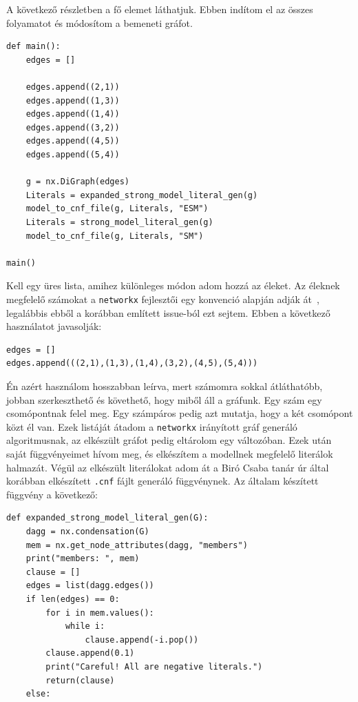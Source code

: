 \documentclass[
]{thesis-ekf}
\theoremstyle{definition}
\theoremstyle{remark}
\begin{document}
	A következő részletben a fő elemet láthatjuk. Ebben indítom el az összes folyamatot és módosítom a bemeneti gráfot.
	
	\begin{lstlisting}
def main():
	edges = []
	
	edges.append((2,1))
	edges.append((1,3))
	edges.append((1,4))
	edges.append((3,2))
	edges.append((4,5))
	edges.append((5,4))
	
	g = nx.DiGraph(edges)
	Literals = expanded_strong_model_literal_gen(g)
	model_to_cnf_file(g, Literals, "ESM")
	Literals = strong_model_literal_gen(g)
	model_to_cnf_file(g, Literals, "SM")
	
main()
	\end{lstlisting}

	
	Kell egy üres lista, amihez különleges módon adom hozzá az éleket. Az éleknek megfelelő számokat a \texttt{networkx} fejlesztői egy konvenció alapján adják át~\cite{git-issue-for-examples}, legalábbis ebből a korábban említett issue-ból ezt sejtem. Ebben a következő használatot javasolják:
	
	\begin{lstlisting}
edges = []
edges.append(((2,1),(1,3),(1,4),(3,2),(4,5),(5,4)))
	\end{lstlisting}
	
	Én azért használom hosszabban leírva, mert számomra sokkal átláthatóbb, jobban szerkeszthető és követhető, hogy miből áll a gráfunk. Egy szám egy csomópontnak felel meg. Egy számpáros pedig azt mutatja, hogy a két csomópont közt él van. Ezek listáját átadom a \texttt{networkx} irányított gráf generáló algoritmusnak, az elkészült gráfot pedig eltárolom egy változóban. Ezek után saját függvényeimet hívom meg, és elkészítem a modellnek megfelelő literálok halmazát. Végül az elkészült literálokat adom át a Biró Csaba tanár úr által korábban elkészített \texttt{.cnf} fájlt generáló függvénynek.
	\newpage
	Az általam készített függvény a következő:

	\begin{lstlisting}[caption=Az általam megírt ESM modell generáló,label=kod-nx-condensation]
def expanded_strong_model_literal_gen(G):
	dagg = nx.condensation(G)
	mem = nx.get_node_attributes(dagg, "members")
	print("members: ", mem)
	clause = []
	edges = list(dagg.edges())
	if len(edges) == 0:
		for i in mem.values():
			while i:
				clause.append(-i.pop())
		clause.append(0.1)
		print("Careful! All are negative literals.")
		return(clause)
	else:
	\end{lstlisting}
\end{document}
